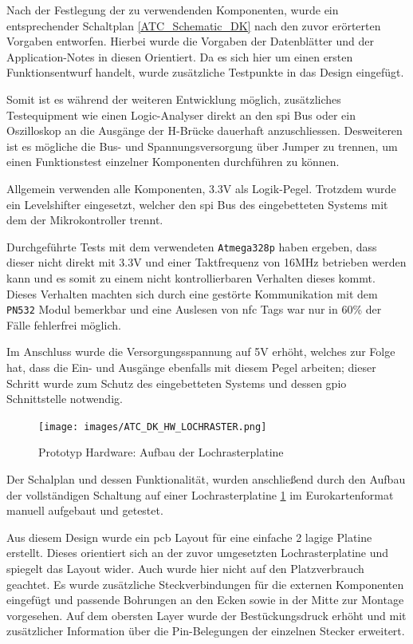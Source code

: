 Nach der Festlegung der zu verwendenden Komponenten, wurde ein
entsprechender Schaltplan \ref{ATC_Schematic_DK} nach den zuvor
erörterten Vorgaben entworfen. Hierbei wurde die Vorgaben der
Datenblätter und der Application-Notes in diesen Orientiert. Da es sich
hier um einen ersten Funktionsentwurf handelt, wurde zusätzliche
Testpunkte in das Design eingefügt.

Somit ist es während der weiteren Entwicklung möglich, zusätzliches
Testequipment wie einen Logic-Analyser direkt an den \gls{spi} Bus oder
ein Oszilloskop an die Ausgänge der H-Brücke dauerhaft anzuschliessen.
Desweiteren ist es mögliche die Bus- und Spannungsversorgung über Jumper
zu trennen, um einen Funktionstest einzelner Komponenten durchführen zu
können.

Allgemein verwenden alle Komponenten, 3.3V als Logik-Pegel. Trotzdem
wurde ein Levelshifter eingesetzt, welcher den \gls{spi} Bus des
eingebetteten Systems mit dem der Mikrokontroller trennt.

Durchgeführte Tests mit dem verwendeten
\passthrough{\lstinline!Atmega328p!} haben ergeben, dass dieser nicht
direkt mit 3.3V und einer Taktfrequenz von 16MHz betrieben werden kann
und es somit zu einem nicht kontrollierbaren Verhalten dieses kommt.
Dieses Verhalten machten sich durch eine gestörte Kommunikation mit dem
\passthrough{\lstinline!PN532!} Modul bemerkbar und eine Auslesen von
\gls{nfc} Tags war nur in 60\% der Fälle fehlerfrei möglich.

Im Anschluss wurde die Versorgungsspannung auf 5V erhöht, welches zur
Folge hat, dass die Ein- und Ausgänge ebenfalls mit diesem Pegel
arbeiten; dieser Schritt wurde zum Schutz des eingebetteten Systems und
dessen \gls{gpio} Schnittstelle notwendig.

\begin{figure}
\centering
\texttt{[image: images/ATC\_DK\_HW\_LOCHRASTER.png]}
\caption{Prototyp Hardware: Aufbau der Lochrasterplatine
\label{ATC_DK_HW_LOCHRASTER}}
\end{figure}

Der Schalplan und dessen Funktionalität, wurden anschließend durch den
Aufbau der vollständigen Schaltung auf einer Lochrasterplatine
\ref{ATC_DK_HW_LOCHRASTER} im Eurokartenformat manuell aufgebaut und
getestet.

Aus diesem Design wurde ein \gls{pcb} Layout für eine einfache 2 lagige
Platine erstellt. Dieses orientiert sich an der zuvor umgesetzten
Lochrasterplatine und spiegelt das Layout wider. Auch wurde hier nicht
auf den Platzverbrauch geachtet. Es wurde zusätzliche Steckverbindungen
für die externen Komponenten eingefügt und passende Bohrungen an den
Ecken sowie in der Mitte zur Montage vorgesehen. Auf dem obersten Layer
wurde der Bestückungsdruck erhöht und mit zusätzlicher Information über
die Pin-Belegungen der einzelnen Stecker erweitert.

